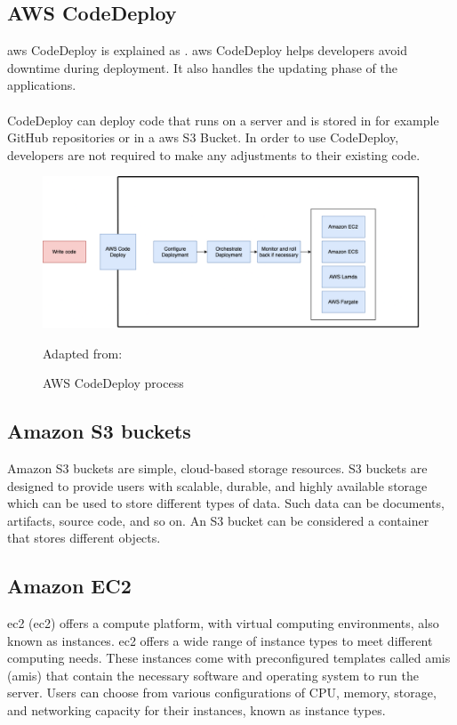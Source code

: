 \subsection{AWS CodeDeploy}
\acrshort{aws} CodeDeploy is explained as  \cite{AWSCodeDeploy}.
\acrshort{aws} CodeDeploy helps developers avoid downtime during deployment. It also handles the updating phase of the applications. 
\\~\\
CodeDeploy can deploy code that runs on a server and is stored in for example GitHub repositories or in a \acrshort{aws} S3 Bucket. In order to use CodeDeploy, developers are not required to make any adjustments to their existing code. \cite{CodeDeploy1}

\begin{figure}[H]
    \centering
    \includegraphics[scale=0.4]{Images/AWSCodeDeploy.png}
    \caption{AWS CodeDeploy process} Adapted from: \cite{CodeDeploy1}
    \label{fig: AWS CodeDeploy Process}
\end{figure}


\subsection{Amazon S3 buckets}
Amazon S3 buckets are simple, cloud-based storage resources. S3 buckets are designed to provide users with scalable, durable, and highly available storage which can be used to store different types of data. Such data can be documents, \gls{artifact}s, source code, and so on. An S3 bucket can be considered a container that stores different objects. \cite{S3Bucket}

\subsection{Amazon EC2}
\acrlong{ec2} (\acrshort{ec2}) offers a \gls{compute platform}, with virtual computing environments, also known as instances. \acrshort{ec2} offers a wide range of instance types to meet different computing needs. These instances come with preconfigured templates called \acrlong{amis} (\acrshort{amis}) that contain the necessary software and operating system to run the server. Users can choose from various configurations of CPU, memory, storage, and networking capacity for their instances, known as instance types. \cite{awsec2}